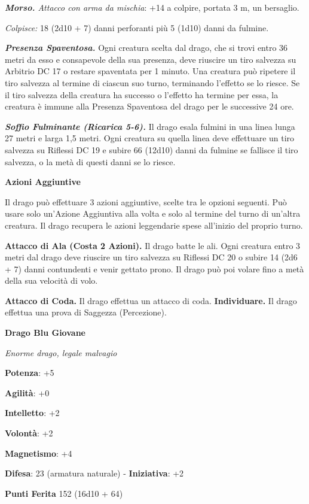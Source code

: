 \begin{multicols}{2}
\emph{\textbf{Morso.} Attacco con arma da mischia}: +14 a colpire,
portata 3 m, un bersaglio.

\emph{Colpisce:} 18 (2d10 + 7) danni perforanti più 5 (1d10) danni da
fulmine.

\emph{\textbf{Presenza Spaventosa.}} Ogni creatura scelta dal drago, che
si trovi entro 36 metri da esso e consapevole della sua presenza, deve
riuscire un tiro salvezza su Arbitrio DC 17 o restare spaventata per 1
minuto. Una creatura può ripetere il tiro salvezza al termine di ciascun
suo turno, terminando l'effetto se lo riesce. Se il tiro salvezza della
creatura ha successo o l'effetto ha termine per essa, la creatura è
immune alla Presenza Spaventosa del drago per le successive 24 ore.

\emph{\textbf{Soffio Fulminante (Ricarica 5-6).}} Il drago esala fulmini
in una linea lunga 27 metri e larga 1,5 metri. Ogni creatura su quella
linea deve effettuare un tiro salvezza su Riflessi DC 19 e subire 66
(12d10) danni da fulmine se fallisce il tiro salvezza, o la metà di
questi danni se lo riesce.

\textbf{Azioni Aggiuntive}

Il drago può effettuare 3 azioni aggiuntive, scelte tra le opzioni
seguenti. Può usare solo un'Azione Aggiuntiva alla volta e solo al
termine del turno di un'altra creatura. Il drago recupera le azioni
leggendarie spese all'inizio del proprio turno.

\textbf{Attacco di Ala (Costa 2 Azioni).} Il drago batte le ali. Ogni
creatura entro 3 metri dal drago deve riuscire un tiro salvezza su Riflessi DC 20 o subire 14 (2d6 + 7) danni contundenti e venir gettato
prono. Il drago può poi volare fino a metà della sua velocità di volo.

\textbf{Attacco di Coda.} Il drago effettua un attacco di coda.
\textbf{Individuare.} Il drago effettua una prova di Saggezza
(Percezione).

\textbf{Drago Blu Giovane}

\emph{Enorme drago, legale malvagio}

\textbf{Potenza}: +5

\textbf{Agilità}: +0

\textbf{Intelletto}: +2

\textbf{Volontà}: +2

\textbf{Magnetismo}: +4

\textbf{Difesa}: 23 (armatura naturale) - \textbf{Iniziativa}: +2

\textbf{Punti Ferita} 152 (16d10 + 64)


\end{multicols}
